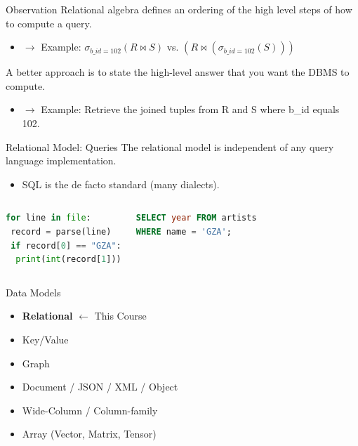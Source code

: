 \documentclass[aspectratio=169, 10pt]{beamer}
\begin{document}
\begin{frame}{Observation}
    Relational algebra defines an ordering of the high level steps of how to compute a query.
    \begin{itemize}
        \item $\rightarrow$ Example: $\sigma_{b\_id=102}(R \bowtie S)$ vs. $(R \bowtie (\sigma_{b\_id=102}(S)))$
    \end{itemize}
    \vspace{1em}
    A better approach is to state the high-level answer that you want the DBMS to compute.
    \begin{itemize}
        \item $\rightarrow$ Example: Retrieve the joined tuples from R and S where b\_id equals 102.
    \end{itemize}
\end{frame}

\begin{frame}[fragile]{Relational Model: Queries}
    The relational model is independent of any query language implementation.
    \begin{itemize}
        \item SQL is the de facto standard (many dialects).
    \end{itemize}
    \vspace{1em}
    \begin{columns}
        \begin{lstlisting}[language=Python]
for line in file:
 record = parse(line)
 if record[0] == "GZA":
  print(int(record[1]))
        \end{lstlisting}
        \begin{lstlisting}[language=SQL]
SELECT year FROM artists
WHERE name = 'GZA';
        \end{lstlisting}
    \end{columns}
\end{frame}

\begin{frame}{Data Models}
    \begin{itemize}
        \item \textbf{Relational} $\leftarrow$ This Course
        \item Key/Value
        \item Graph
        \item Document / JSON / XML / Object
        \item Wide-Column / Column-family
        \item Array (Vector, Matrix, Tensor)
    \end{itemize}
\end{frame}
\end{document}
